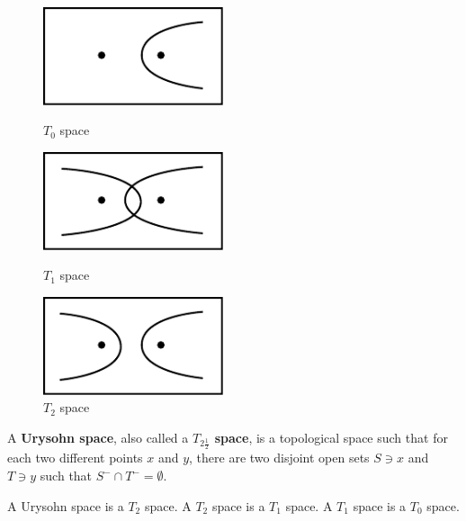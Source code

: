 \documentclass[12pt]{book}
\begin{document}
	\begin{figure}[htb!]
		\centering  
		\begin{minipage}[t]{0.3\textwidth}  
		\centering  
		\includegraphics[width=150pt]{resources/chap_sep_count/T0.pdf}  
		\caption{$T_0$ space}
		\label{fig:T0}
		\end{minipage}  
		\begin{minipage}[t]{0.3\textwidth}  
		\centering  
		\includegraphics[width=150pt]{resources/chap_sep_count/T1.pdf}  
		\caption{$T_1$ space}  
		\label{fig:T1}
		\end{minipage}  
		\begin{minipage}[t]{0.3\textwidth}  
		\centering  
		\includegraphics[width=150pt]{resources/chap_sep_count/T2.pdf}  
		\caption{$T_2$ space}  
		\label{fig:T2}
		\end{minipage}  
	\end{figure}
	
	\begin{definition}
		A {\bf Urysohn space}, also called a {\bf $T_{2\frac 12}$ space}, is a topological space such that for each two different points $x$ and $y$, there are two disjoint open sets $S\ni x$ and $T\ni y$ such that $S^-\cap T^-=\emptyset$.
	\end{definition}
	\begin{theorem}
		A Urysohn space is a $T_2$ space. A $T_2$ space is a $T_1$ space. A $T_1$ space is a $T_0$ space.
	\end{theorem}
	
\end{document}
